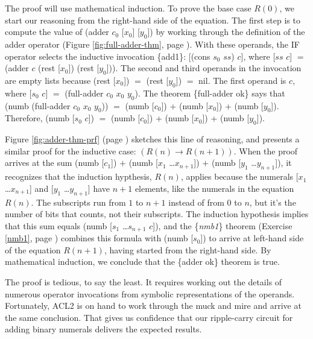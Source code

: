 The proof will use mathematical induction.
To prove the base case $R(0)$,
we start our reasoning from the right-hand side of the equation.
The first step is
to compute the value of (adder $c_0$ [$x_0$] [$y_0$])
by working through the definition of the adder operator
(Figure \ref{fig:full-adder-thm}, page \pageref{fig:full-adder-thm}).
With these operands, the IF operator selects the inductive invocation \{add1\}:
[(cons $s_0$ $ss$) $c$], where [$ss$ $c$] $=$ (adder $c$ (rest [$x_0$]) (rest [$y_0$])).
The second and third operands in the invocation
are empty lists because (rest [$x_0$]) $=$ (rest [$y_0$]) $=$ nil.
The first operand is $c$, where [$s_0$ $c$] $=$ (full-adder $c_0$ $x_0$ $y_0$).
The theorem \{full-adder ok\} says that
(numb (full-adder $c_0$ $x_0$ $y_0$)) $=$ (numb [$c_0$]) + (numb [$x_0$]) + (numb [$y_0$]).
Therefore, (numb [$s_0$ $c$]) $=$ (numb [$c_0$]) + (numb [$x_0$]) + (numb [$y_0$]).

Figure \ref{fig:adder-thm-prf} (page \pageref{fig:adder-thm-prf}) sketches
this line of reasoning,
and presents a similar proof for the inductive case: $(R(n) \rightarrow R(n+1))$.
When the proof arrives at the sum
(numb [$c_1$]) $+$ (numb [$x_1$ \dots $x_{n+1}$]) $+$ (numb [$y_1$ \dots $y_{n+1}$]),
it recognizes that the induction hypthesis, $R(n)$, applies because
the numerals [$x_1$ \dots $x_{n+1}$] and [$y_1$ \dots $y_{n+1}$] have $n+1$
elements, like the numerals in the equation $R(n)$.
The subscripts run from $1$ to $n+1$ instead of from $0$ to $n$,
but it's the number of bits that counts, not their subscripts.
The induction hypothesis implies that this sum equals
(numb [$s_1$ \dots $s_{n+1}$ $c$]), and
the \{\emph{nmb1}\} theorem (Exercise \ref{nmb1}, page \pageref{nmb1})
combines this formula with (numb [$s_0$]) to arrive at left-hand side
of the equation $R(n+1)$, having started from the right-hand side.
By mathematical induction, we conclude that
the \{adder ok\} theorem is true.

The proof is tedious, to say the least.
It requires working out the details of
numerous operator invocations
from symbolic representations of the operands.
Fortunately, ACL2 is on hand to work through the
muck and mire and arrive at the same conclusion.
That gives us confidence that our ripple-carry circuit
for adding binary numerals delivers the expected results.

